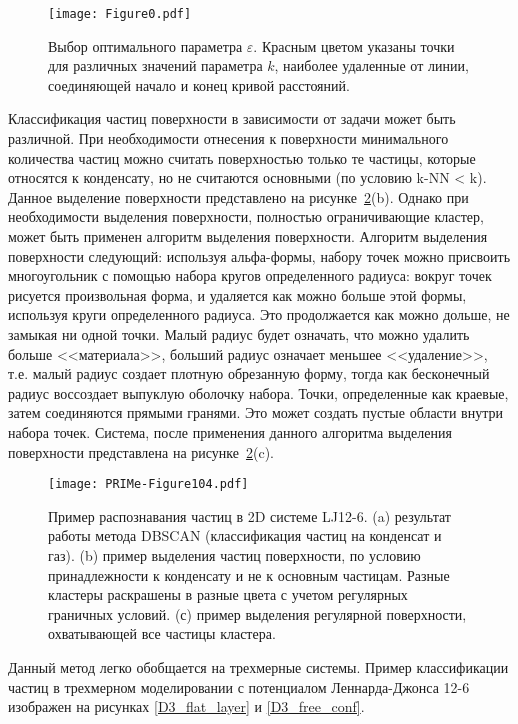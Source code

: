 \begin{figure}[!t]
    \centering
    \texttt{[image: Figure0.pdf]}
    \caption{Выбор оптимального параметра $\varepsilon$. Красным цветом указаны точки для различных значений параметра $k$, наиболее удаленные от линии, соединяющей начало и конец кривой расстояний.}
    \label{epsilon_k}
\end{figure}

Классификация частиц поверхности в зависимости от задачи может быть различной.
При необходимости отнесения к поверхности минимального количества частиц можно считать поверхностью только те частицы, которые относятся к конденсату, но не считаются основными (по условию k-NN < k).
Данное выделение поверхности представлено на рисунке~\ref{DBSCAN-Illustr}(b).
Однако при необходимости выделения поверхности, полностью ограничивающие кластер, может быть применен алгоритм выделения поверхности.
Алгоритм выделения поверхности следующий: используя альфа-формы, набору точек можно присвоить многоугольник с помощью набора кругов определенного радиуса: вокруг точек рисуется произвольная форма, и удаляется как можно больше этой формы, используя круги определенного радиуса.
Это продолжается как можно дольше, не замыкая ни одной точки.
Малый радиус будет означать, что можно удалить больше <<материала>>, больший радиус означает меньшее <<удаление>>, т.е. малый радиус создает плотную обрезанную форму, тогда как бесконечный радиус воссоздает выпуклую оболочку набора.
Точки, определенные как краевые, затем соединяются прямыми гранями.
Это может создать пустые области внутри набора точек.
Система, после применения данного алгоритма выделения поверхности представлена на рисунке~\ref{DBSCAN-Illustr}(c).

\begin{figure}[!t]
    \centering
    \texttt{[image: PRIMe-Figure104.pdf]}
    \caption{Пример распознавания частиц в 2D системе LJ12-6. (a) результат работы метода DBSCAN (классификация частиц на конденсат и газ). (b) пример выделения частиц поверхности, по условию принадлежности к конденсату и не к основным частицам. Разные кластеры раскрашены в разные цвета с учетом регулярных граничных условий. (с) пример выделения регулярной поверхности, охватывающей все частицы кластера.}
    \label{DBSCAN-Illustr}
\end{figure}

Данный метод легко обобщается на трехмерные системы. Пример классификации частиц в трехмерном моделировании с потенциалом Леннарда-Джонса 12-6 изображен на рисунках \ref{D3_flat_layer} и \ref{D3_free_conf}.

